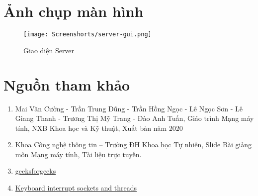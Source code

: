 \documentclass[a4paper,12pt]{report}
\begin{document}
\pagebreak
\section{Ảnh chụp màn hình}
\begin{figure}[ht]
  \centering
  \texttt{[image: Screenshorts/server-gui.png]}
  \caption{Giao diện Server}\label{fig:server-gui}
\end{figure}

\pagebreak
\section{Nguồn tham khảo}
\begin{enumerate}
    \item Mai Văn Cường - Trần Trung Dũng - Trần Hồng Ngọc - Lê Ngọc Sơn - Lê Giang 
Thanh - Trương Thị Mỹ Trang - Đào Anh Tuấn, Giáo trình Mạng máy tính, NXB 
Khoa học và Kỹ thuật, Xuất bản năm 2020
    \item Khoa Công nghệ thông tin – Trường ĐH Khoa học Tự nhiên, Slide Bài giảng môn 
Mạng máy tính, Tài liệu trực tuyến.
  \item \href{https://www.geeksforgeeks.org/}{geeksforgeeks}
  \item \href{https://stackoverflow.com/questions/47847392/keyboard-interrupt-sockets-and-threads}{Keyboard interrupt sockets and threads}
\end{enumerate}
\end{document}

